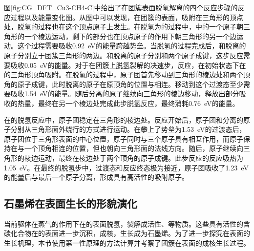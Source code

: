     图\ref{fig:CG_DFT_Cu3-CH4-C}中给出了在团簇表面脱氢解离的四个反应步骤的反应过程以及能量变化图。从图中可以发现，在团簇的表面，吸附在三角形的顶点处，脱氢的过程也在这个顶点原子上发生。在脱氢为的过程中，中的一个原子朝三角形的一个棱边运动，剩下的部分也在顶点原子的作用下朝三角形的另一个边运动。这个过程需要吸收\SI{0.92}{\electronvolt}的能量跨越势垒。当脱氢的过程完成后，和脱离的原子分别立于团簇三角形的两边。和脱离的原子分别和两个原子成键，这步反应需要吸收\SI{0.05}{\electronvolt}的能量。对于在团簇上脱氢裂解的决速步，反应，在初始状态下在的三角形顶角吸附。在脱氢的过程中，原子团首先移动到三角形的棱边处和两个顶角的原子成键，此时脱离的原子在原顶角的位置与相连。移动到这个过渡态至少需要吸收\SI{1.54}{\electronvolt}的能量。随后分离的原子继续向三角形的棱边移动，释放出部分吸收的热量，最终在另一个棱边处完成此步脱氢反应，最终消耗\SI{0.76}{\electronvolt}的能量。
    
    在的脱氢反应中，原子团稳定在三角形的棱边处。反应开始后，原子团和分离的原子分别从三角形面外绕行的方式进行运动。在攀上了势垒为\SI{1.53}{\electronvolt}的过渡态后，原子团位于三角形表面的中心位置，原子同时与三个原子具有相互作用，而原子保持在与一个顶角相连的位置，但也朝向三角形面的法线方向。随后，原子继续向三角形的棱边运动，最终在棱边处于两个顶角的原子成键。此步反应的反应吸热为\SI{1.05}{\electronvolt}。在最终的脱氢步中，过渡态和反应终态极为接近，原子团吸收了\SI{1.23}{\electronvolt}的能量后与最后一个原子分离，形成具有高活性的吸附原子。
    
    \subsection{石墨烯在表面生长的形貌演化}
    
    当前驱体在蒸气的作用下在的表面脱氢，裂解成活性、等物质。这些具有活性的含碳化合物在的表面进一步沉积，成核，生长成为石墨烯。为了进一步探究在表面的生长机理，本节使用第一性原理的方法计算并考察了团簇在表面的成核生长过程。
    
